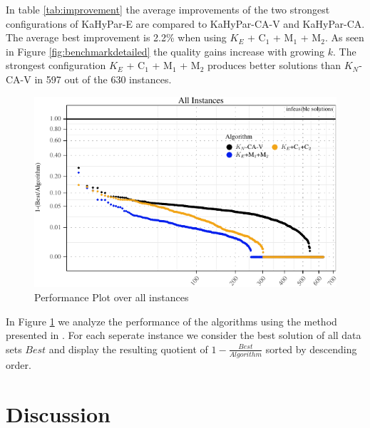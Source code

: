 \documentclass[a4paper,12pt,titlepage, BCOR7mm,headsepline]{scrbook}
\numberwithin{equation}{section}
\begin{document}
In table  \ref{tab:improvement} the average improvements of the two strongest configurations of KaHyPar-E are compared to KaHyPar-CA-V and KaHyPar-CA. The average best improvement is 2.2\% when using $K_E$ + C$_1$ + M$_1$ + M$_2$. As seen in Figure \ref{fig:benchmarkdetailed} the quality gains increase with growing $k$. The strongest configuration $K_E$ + C$_1$ + M$_1$ + M$_2$ produces better solutions than $K_N$-CA-V in 597 out of the 630 instances. 
\begin{figure}[H]
\begin{center}
\includegraphics[width=\textwidth]{rnw/tuning_subset_plots/performance_plot_main-1}
\caption{Performance Plot over all instances}
\label{fig:performanceplot}
\end{center}
\end{figure}
In Figure \ref{fig:performanceplot} we analyze the performance of the algorithms using the method presented in \cite{schlag2016k}. For each seperate instance we consider the best solution of all data sets $Best$ and display the resulting quotient of $1 - \frac{Best}{Algorithm}$ sorted by descending order.






\chapter{Discussion}
\label{chapter:discussion}
\end{document}
